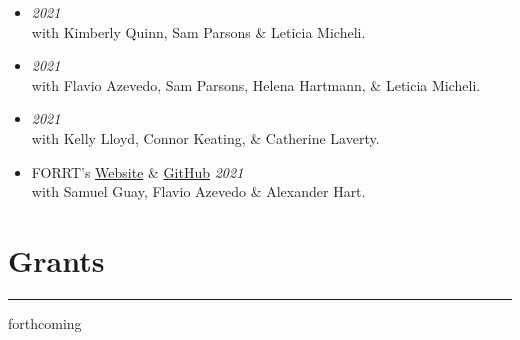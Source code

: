 \documentclass[letterpaper]{article}
\begin{document}
\begin{itemize}
\item[]{} \hfill {\em 2021} \\
with Kimberly Quinn, Sam Parsons \& Leticia Micheli.

\item[]{} \hfill {\em 2021} \\
with Flavio Azevedo, Sam Parsons, Helena Hartmann, \& Leticia Micheli.

\item[]{} \hfill {\em 2021} \\
with Kelly Lloyd, Connor Keating, \& Catherine Laverty.

\item[]{} FORRT's \href{https://forrt.org}{{\color{BlueViolet}Website}} \& \href{https://github.com/forrtproject/forrtproject.github.io}{{\color{BlueViolet}GitHub}} \hfill {\em 2021} \\
with Samuel Guay, Flavio Azevedo \& Alexander Hart.

\end{itemize}









\section*{\color{Brown} Grants}
\vspace{-.5em}
\hrule
\vspace{1em}
    \begin{center}
    \large \color{Gray}
    \vspace{-0.5em}
    \item \hspace{-1.5em}forthcoming
    \end{center}
\end{document}
